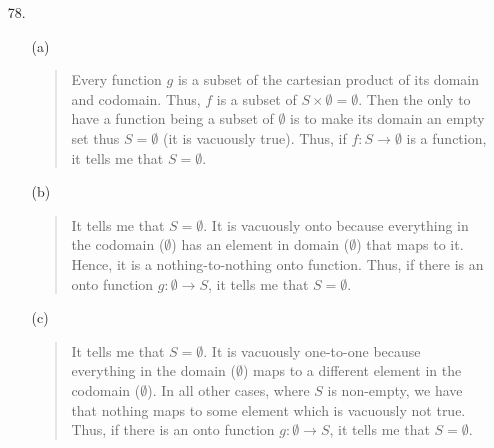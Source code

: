 \documentclass[12pt, a4paper]{article}
\begin{document}
\begin{itemize}
\begin{itemize}
\end{itemize}

\item[]
\item[]

\item[78.]
\begin{itemize}
\item[(a)]
\begin{quote}
Every function $g$ is a subset of the cartesian product of its domain and codomain.
Thus, $f$ is a subset of $S \times \emptyset = \emptyset$. Then the only
to have a function being a subset of $\emptyset$ is to make its domain
an empty set thus $S = \emptyset$ (it is vacuously true). Thus, if $f : S \rightarrow \emptyset$ is a function,
it tells me that $S = \emptyset$.
\end{quote}

\item[]

\item[(b)]
\begin{quote}
It tells me that $S = \emptyset$. It is vacuously onto because everything in the codomain ($\emptyset$)
has an element in domain ($\emptyset$) that maps to it. Hence, it is a nothing-to-nothing onto function.
Thus, if there is an onto function $g : \emptyset \rightarrow S$, it tells me that $S = \emptyset$.
\end{quote}

\item[]

\item[(c)]
\begin{quote}
It tells me that $S = \emptyset$. It is vacuously one-to-one because everything in the domain ($\emptyset$)
maps to a different element in the codomain ($\emptyset$). In all other cases, where $S$ is non-empty, we have
that nothing maps to some element which is vacuously not true.
Thus, if there is an onto function $g : \emptyset \rightarrow S$, it tells me that $S = \emptyset$.
\end{quote}
\end{itemize}

\item[]
\item[]


\end{itemize}
\end{document}
